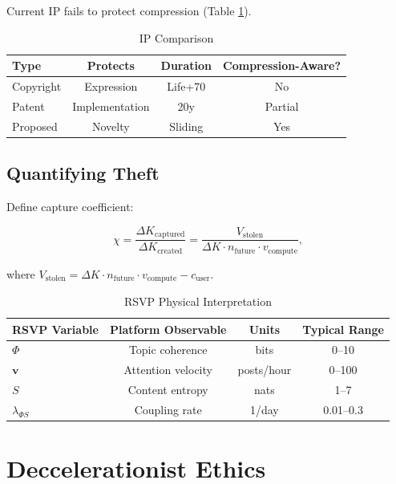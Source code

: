 \documentclass[12pt]{article}
\begin{document}
Current IP fails to protect compression (Table \ref{tab:ip}).

\begin{table}[h]
\caption{IP Comparison}
\begin{center}
\begin{tabular}{lccc}
\toprule
\textbf{Type} & \textbf{Protects} & \textbf{Duration} & \textbf{Compression-Aware?} \\
\midrule
Copyright & Expression & Life+70 & No \\
Patent & Implementation & 20y & Partial \\
Proposed & Novelty & Sliding & Yes \\
\bottomrule
\end{tabular}
\end{center}
\label{tab:ip}
\end{table}

\subsection{Quantifying Theft}

Define capture coefficient:

\[
\chi = \frac{\Delta K_{\text{captured}}}{\Delta K_{\text{created}}} = \frac{V_{\text{stolen}}}{\Delta K \cdot n_{\text{future}} \cdot v_{\text{compute}}},
\]

where \( V_{\text{stolen}} = \Delta K \cdot n_{\text{future}} \cdot v_{\text{compute}} - c_{\text{user}} \).

\begin{table}[h]
\caption{RSVP Physical Interpretation}
\begin{center}
\begin{tabular}{lccc}
\toprule
RSVP Variable & Platform Observable & Units & Typical Range \\
\midrule
\(\Phi\) & Topic coherence & bits & 0–10 \\
\(\mathbf{v}\) & Attention velocity & posts/hour & 0–100 \\
\(S\) & Content entropy & nats & 1–7 \\
\(\lambda_{\Phi S}\) & Coupling rate & 1/day & 0.01–0.3 \\
\bottomrule
\end{tabular}
\end{center}
\label{tab:rsvp_interp}
\end{table}

\section{Deccelerationist Ethics}
\end{document}
